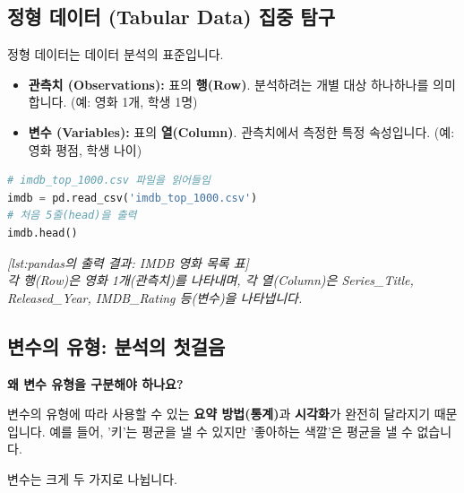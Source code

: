 \documentclass[11pt,a4paper]{book}
\theoremstyle{definition}
\begin{document}
\subsection{정형 데이터 (Tabular Data) 집중 탐구}

정형 데이터는 데이터 분석의 표준입니다.

\begin{itemize}
    \item \textbf{관측치 (Observations):} 표의 \textbf{행(Row)}. 분석하려는 개별 대상 하나하나를 의미합니다. (예: 영화 1개, 학생 1명)
    \item \textbf{변수 (Variables):} 표의 \textbf{열(Column)}. 관측치에서 측정한 특정 속성입니다. (예: 영화 평점, 학생 나이)
\end{itemize}

\begin{lstlisting}[language=Python, caption={Pandas를 이용한 정형 데이터(CSV) 로딩 예시}, label={lst:pandas}, breaklines=true]
# imdb_top_1000.csv 파일을 읽어들임
imdb = pd.read_csv('imdb_top_1000.csv')
# 처음 5줄(head)을 출력
imdb.head()
\end{lstlisting}

\begin{center}
    \textit{[lst:pandas의 출력 결과: IMDB 영화 목록 표]} \\
    \textit{각 행(Row)은 영화 1개(관측치)를 나타내며,
    각 열(Column)은 Series\_Title, Released\_Year, IMDB\_Rating 등(변수)을 나타냅니다.}
\end{center}

\subsection{변수의 유형: 분석의 첫걸음}

\begin{warningbox}
\textbf{왜 변수 유형을 구분해야 하나요?}

변수의 유형에 따라 사용할 수 있는 \textbf{요약 방법(통계)}과 \textbf{시각화}가 완전히 달라지기 때문입니다.
예를 들어, '키'는 평균을 낼 수 있지만 '좋아하는 색깔'은 평균을 낼 수 없습니다.
\end{warningbox}

변수는 크게 두 가지로 나뉩니다.
\end{document}
